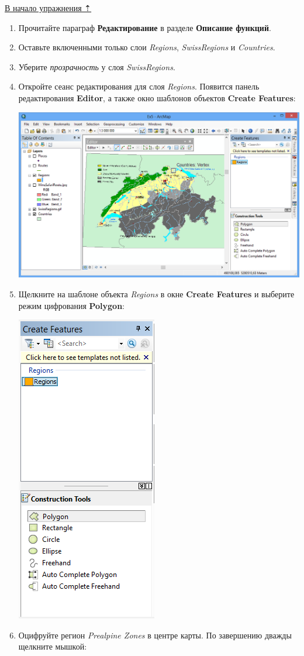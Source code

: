 \documentclass[12pt,]{book}
\begin{document}
\protect\hyperlink{map-ref-general}{В начало упражнения ⇡}

\begin{enumerate}
\def\labelenumi{\arabic{enumi}.}
\item
  Прочитайте параграф \textbf{Редактирование} в разделе \textbf{Описание функций}.
\item
  Оставьте включенными только слои \emph{Regions}, \emph{SwissRegions} и \emph{Countries}.
\item
  Уберите \emph{прозрачность} у слоя \emph{SwissRegions}.
\item
  Откройте сеанс редактирования для слоя \emph{Regions}. Появится панель редактирования \textbf{Editor}, а также окно шаблонов объектов \textbf{Create Features}:

  \includegraphics{images/Ex05/image15.png}
\item
  Щелкните на шаблоне объекта \emph{Regions} в окне \textbf{Create Features} и выберите режим цифрования \textbf{Polygon}:

  \includegraphics{images/Ex05/image16.png}
\item
  Оцифруйте регион \emph{Prealpine Zones} в центре карты. По завершению дважды щелкните мышкой:


\end{enumerate}
\end{document}
